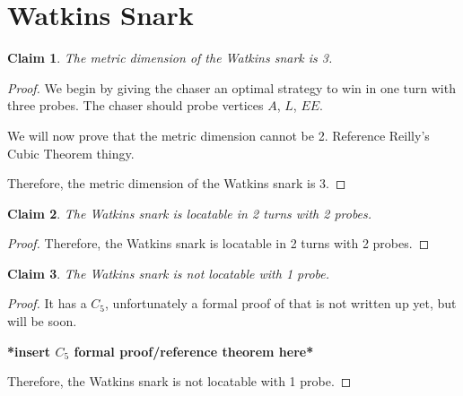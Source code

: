 \documentclass[11pt]{article}
\newtheorem{clm}{Claim}
\begin{document}
\newpage

\section{Watkins Snark}
\begin{clm}
	The metric dimension of the Watkins snark is 3.
\end{clm}
\begin{proof}
	We begin by giving the chaser an optimal strategy to win in one turn with three probes. The chaser should probe vertices $A$, $L$, $EE$.
	
	We will now prove that the metric dimension cannot be 2. Reference Reilly's Cubic Theorem thingy.
	
	Therefore, the metric dimension of the Watkins snark is 3.
\end{proof}
\begin{clm}
	The Watkins snark is locatable in 2 turns with 2 probes.
\end{clm}
\begin{proof}
	Therefore, the Watkins snark is locatable in 2 turns with 2 probes.
\end{proof}
\begin{clm}
	The Watkins snark is not locatable with 1 probe.
\end{clm}
\begin{proof}
	It has a $C_5$, unfortunately a formal proof of that is not written up yet, but will be soon.
	
	\textbf{*insert $C_5$ formal proof/reference theorem here*}
	
	Therefore, the Watkins snark is not locatable with 1 probe.
\end{proof}
\end{document}
